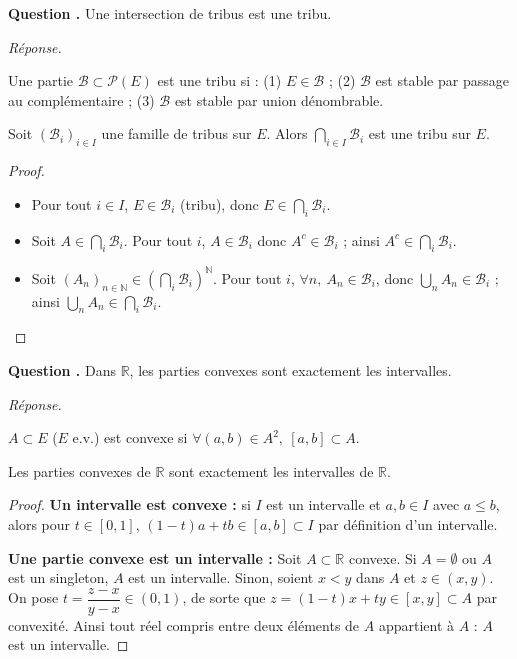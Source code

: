 \documentclass[11pt]{article}
\newcounter{qnum}
\newcommand{\question}[1]{%
\stepcounter{qnum}%
\bigskip
\noindent\textbf{Question \theqnum.} #1\par}
\newcommand{\reponse}{\noindent\textit{Réponse.}\ }
\begin{document}
\question{Une intersection de tribus est une tribu.}
\reponse
\begin{defi}[Tribu]
Une partie $\mathcal{B}\subset\mathcal{P}(E)$ est une tribu si : (1) $E\in\mathcal{B}$ ; (2) $\mathcal{B}$ est stable par passage au complémentaire ; (3) $\mathcal{B}$ est stable par union dénombrable.
\end{defi}

\begin{prop}
Soit $(\mathcal{B}_i)_{i\in I}$ une famille de tribus sur $E$. Alors $\displaystyle\bigcap_{i\in I}\mathcal{B}_i$ est une tribu sur $E$.
\end{prop}

\begin{proof}
\begin{itemize}
\item Pour tout $i\in I$, $E\in\mathcal{B}_i$ (tribu), donc $E\in\bigcap_i \mathcal{B}_i$.
\item Soit $A\in\bigcap_i\mathcal{B}_i$. Pour tout $i$, $A\in\mathcal{B}_i$ donc $A^c\in\mathcal{B}_i$ ; ainsi $A^c\in\bigcap_i\mathcal{B}_i$.
\item Soit $(A_n)_{n\in\mathbb{N}}\in\left(\bigcap_i\mathcal{B}_i\right)^{\mathbb{N}}$. Pour tout $i$, $\forall n,\ A_n\in\mathcal{B}_i$, donc $\bigcup_n A_n\in\mathcal{B}_i$ ; ainsi $\bigcup_n A_n\in\bigcap_i\mathcal{B}_i$.
\end{itemize}
\end{proof}

\question{Dans $\mathbb{R}$, les parties convexes sont exactement les intervalles.}
\reponse
\begin{defi}
$A\subset E$ ($E$ e.v.) est convexe si $\forall (a,b)\in A^2,\ [a,b]\subset A$.
\end{defi}

\begin{prop}
Les parties convexes de $\mathbb{R}$ sont exactement les intervalles de $\mathbb{R}$.
\end{prop}

\begin{proof}
\textbf{Un intervalle est convexe :} si $I$ est un intervalle et $a,b\in I$ avec $a\leq b$, alors pour $t\in[0,1]$, $(1-t)a+tb\in[a,b]\subset I$ par définition d'un intervalle.

\textbf{Une partie convexe est un intervalle :} Soit $A\subset\mathbb{R}$ convexe. Si $A=\emptyset$ ou $A$ est un singleton, $A$ est un intervalle. Sinon, soient $x<y$ dans $A$ et $z\in(x,y)$. On pose $t=\dfrac{z-x}{y-x}\in(0,1)$, de sorte que $z=(1-t)x+ty\in[x,y]\subset A$ par convexité. Ainsi tout réel compris entre deux éléments de $A$ appartient à $A$ : $A$ est un intervalle.
\end{proof}
\end{document}

